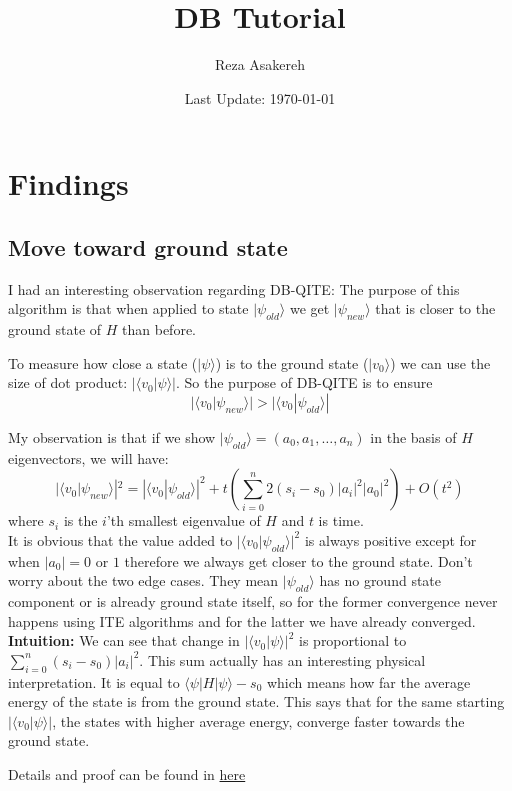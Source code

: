 \documentclass[11pt]{article}
\title{DB Tutorial}
\author{Reza Asakereh}
\date{Last Update: \today}
\begin{document}
\maketitle

\section{Findings}
\subsection{Move toward ground state}
I had an interesting observation regarding DB-QITE:
The purpose of this algorithm is that when applied to state $|\psi_{old}\rangle$ we get $|\psi_{new}\rangle$ that is closer to the ground state of $H$ than before.

To measure how close a state ($|\psi\rangle$) is to the ground state ($|v_0\rangle$) we can use the size of dot product: $| \langle v_0 | \psi \rangle |$. So the purpose of DB-QITE is to ensure
$$| \langle v_0 | \psi_{new} \rangle | > | \langle v_0 | \psi_{old} \rangle |$$

My observation is that if we show $| \psi_{old} \rangle = (a_0, a_1, \dots, a_n)$ in the basis of $H$ eigenvectors, we will have:
$$
| \langle v_0 | \psi_{new} \rangle |^2 = | \langle v_0 | \psi_{old} \rangle |^2 + t(\sum_{i=0}^n{2(s_i - s_0)|a_i|^2|a_0|^2}) + O(t^2)
$$
where $s_i$ is the $i$'th smallest eigenvalue of $H$ and $t$ is time.
\\

It is obvious that the value added to $| \langle v_0 | \psi_{old} \rangle |^2$ is always positive except for when $|a_0| = 0$ or $1$ therefore we always get closer to the ground state.
Don't worry about the two edge cases. They mean $| \psi_{old} \rangle$ has no ground state component or is already ground state itself, so for the former convergence never happens using ITE algorithms and for the latter we have already converged.
\\


\textbf{Intuition:}
We can see that change in $| \langle v_0 | \psi \rangle |^2$ is proportional to $\sum_{i=0}^n{(s_i - s_0)|a_i|^2}$. This sum actually has an interesting physical interpretation. It is equal to $\langle \psi | H | \psi \rangle - s_0$ which means how far the average energy of the state is from the ground state. This says that for the same starting $| \langle v_0 | \psi \rangle |$, the states with higher average energy, converge faster towards the ground state.

Details and proof can be found in \href{https://colab.research.google.com/drive/1dsnv5_XMr6TzfRn7-RQuOCWzfpAqkZ1y?usp=sharing}{here}
\end{document}
